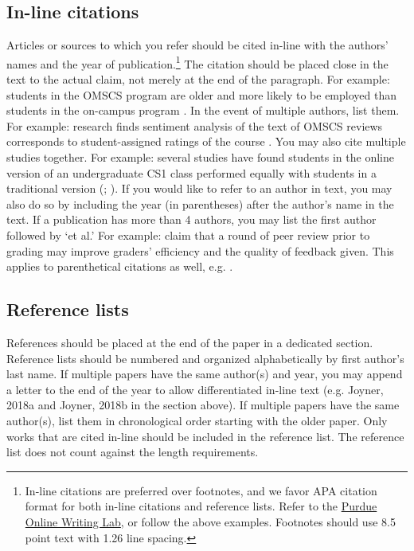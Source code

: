 \documentclass[
	letterpaper, %
]{jdf}
\begin{document}
\subsection{In-line citations}
Articles or sources to which you refer should be cited in-line with the authors’ names and the year of publication.\footnote{In-line citations are preferred over footnotes, and we favor APA citation format for both in-line citations and reference lists. Refer to the \href{https://owl.purdue.edu/owl/research_and_citation/apa_style/apa_formatting_and_style_guide/in_text_citations_the_basics.html}{Purdue Online Writing Lab}, or follow the above examples. Footnotes should use 8.5 point text with 1.26 line spacing.} The citation should be placed close in the text to the actual claim, not merely at the end of the paragraph. For example: students in the OMSCS program are older and more likely to be employed than students in the on-campus program \citep{joyner2017}. In the event of multiple authors, list them. For example: research finds sentiment analysis of the text of OMSCS reviews corresponds to student-assigned ratings of the course \citep{newman2018}. You may also cite multiple studies together. For example: several studies have found students in the online version of an undergraduate CS1 class performed equally with students in a traditional version (\cite{joyner2018a}; \cite{joyner2018b}). If you would like to refer to an author in text, you may also do so by including the year (in parentheses) after the author’s name in the text. If a publication has more than 4 authors, you may list the first author followed by ‘et al.’ For example:  claim that a round of peer review prior to grading may improve graders’ efficiency and the quality of feedback given. This applies to parenthetical citations as well, e.g. \citep{joyner2016}.

\subsection{Reference lists}
References should be placed at the end of the paper in a dedicated section. Reference lists should be numbered and organized alphabetically by first author’s last name. If multiple papers have the same author(s) and year, you may append a letter to the end of the year to allow differentiated in-line text (e.g. Joyner, 2018a and Joyner, 2018b in the section above). If multiple papers have the same author(s), list them in chronological order starting with the older paper. Only works that are cited in-line should be included in the reference list. The reference list does not count against the length requirements.
\end{document}
